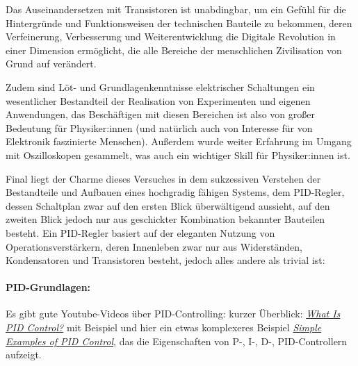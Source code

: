 Das Auseinandersetzen mit Transistoren ist unabdingbar, um ein Gefühl für die Hintergründe und Funktionsweisen der technischen Bauteile zu bekommen, deren Verfeinerung, Verbesserung und Weiterentwicklung die Digitale Revolution in einer Dimension ermöglicht, die alle Bereiche der menschlichen Zivilisation von Grund auf verändert. 

Zudem sind Löt- und Grundlagenkenntnisse elektrischer Schaltungen ein wesentlicher Bestandteil der Realisation von Experimenten und eigenen Anwendungen, das Beschäftigen mit diesen Bereichen ist also von großer Bedeutung für Physiker:innen (und natürlich auch von Interesse für von Elektronik faszinierte Menschen). Außerdem wurde weiter Erfahrung im Umgang mit Oszilloskopen gesammelt, was auch ein wichtiger Skill für Physiker:innen ist.

Final liegt der Charme dieses Versuches in dem sukzessiven Verstehen der Bestandteile und Aufbauen eines hochgradig fähigen Systems, dem PID-Regler, dessen Schaltplan \cite[vgl.][11]{Skript_01} zwar auf den ersten Blick überwältigend aussieht, auf den zweiten Blick jedoch nur aus geschickter Kombination bekannter Bauteilen besteht. Ein PID-Regler basiert auf der eleganten Nutzung von Operationsverstärkern, deren Innenleben zwar nur aus Widerständen, Kondensatoren und Transistoren besteht, jedoch alles andere als trivial ist:

\paragraph{PID-Grundlagen:} Es gibt gute Youtube-Videos über PID-Controlling: kurzer Überblick: \href{https://youtu.be/wkfEZmsQqiA?si=atU3_SOSYyGcCa4w}{\emph{What Is PID Control?}} mit Beispiel und hier ein etwas komplexeres Beispiel \href{https://www.youtube.com/watch?v=XfAt6hNV8XM}{\emph{Simple Examples of PID Control}}, das die Eigenschaften von P-, I-, D-, PID-Controllern aufzeigt.